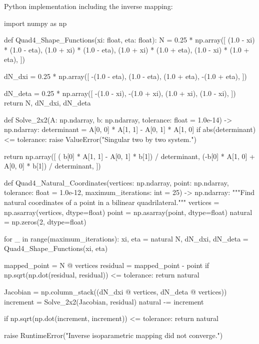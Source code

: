 Python implementation including the inverse mapping:

\begin{python}
import numpy as np


def Quad4_Shape_Functions(xi: float, eta: float):
    N = 0.25 * np.array([
        (1.0 - xi) * (1.0 - eta),
        (1.0 + xi) * (1.0 - eta),
        (1.0 + xi) * (1.0 + eta),
        (1.0 - xi) * (1.0 + eta),
    ])

    dN_dxi = 0.25 * np.array([
        -(1.0 - eta),
         (1.0 - eta),
         (1.0 + eta),
        -(1.0 + eta),
    ])

    dN_deta = 0.25 * np.array([
        -(1.0 - xi),
        -(1.0 + xi),
         (1.0 + xi),
         (1.0 - xi),
    ])
    return N, dN_dxi, dN_deta


def Solve_2x2(A: np.ndarray, b: np.ndarray,
              tolerance: float = 1.0e-14) -> np.ndarray:
    determinant = A[0, 0] * A[1, 1] - A[0, 1] * A[1, 0]
    if abs(determinant) <= tolerance:
        raise ValueError("Singular two by two system.")

    return np.array([
        ( b[0] * A[1, 1] - A[0, 1] * b[1]) / determinant,
        (-b[0] * A[1, 0] + A[0, 0] * b[1]) / determinant,
    ])


def Quad4_Natural_Coordinates(vertices: np.ndarray,
                              point: np.ndarray,
                              tolerance: float = 1.0e-12,
                              maximum_iterations: int = 25) -> np.ndarray:
    """Find natural coordinates of a point in a bilinear quadrilateral."""
    vertices = np.asarray(vertices, dtype=float)
    point = np.asarray(point, dtype=float)
    natural = np.zeros(2, dtype=float)

    for _ in range(maximum_iterations):
        xi, eta = natural
        N, dN_dxi, dN_deta = Quad4_Shape_Functions(xi, eta)

        mapped_point = N @ vertices
        residual = mapped_point - point
        if np.sqrt(np.dot(residual, residual)) <= tolerance:
            return natural

        Jacobian = np.column_stack((dN_dxi @ vertices,
                                    dN_deta @ vertices))
        increment = Solve_2x2(Jacobian, residual)
        natural -= increment

        if np.sqrt(np.dot(increment, increment)) <= tolerance:
            return natural

    raise RuntimeError("Inverse isoparametric mapping did not converge.")



\end{python}

